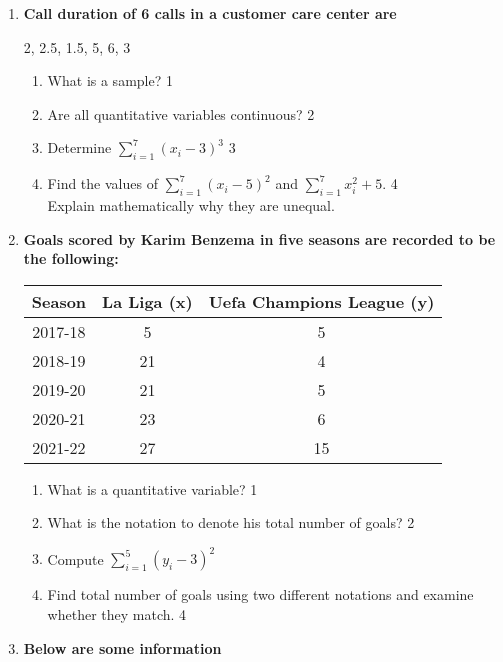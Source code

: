 \documentclass[a4paper,oneside]{book}
\begin{document}
\begin{enumerate}
  
   \item
  \textbf{Call duration of 6 calls in a customer care center are}
  
  \begin{center}
  2, 2.5, 1.5, 5, 6, 3
  \end{center}
 
  \begin{enumerate}
    \item
	What is a sample? \hfill 1
    \item
    	Are all quantitative variables continuous?  \hfill 2
    \item
    	Determine $\displaystyle \sum_{i=1}^7 (x_i-3)^3$ \hfill 3
     \item
     	Find the values of  $\displaystyle \sum_{i=1}^7 (x_i-5)^2$ and $\displaystyle \sum_{i=1}^7 x_i^2+5.$  \hfill 4 \\
     	Explain mathematically why they are unequal.
  \end{enumerate}
  
   \item
	  \textbf{Goals scored by Karim Benzema in five seasons are recorded to be the following:} 
	  
	  \begin{table}[h]
	  \centering
\begin{tabular}{c|c|c}
Season & La Liga (x) & Uefa Champions League (y) \\ \hline
2017-18 & 5 & 5 \\ 
2018-19 & 21 & 4 \\
2019-20 & 21 & 5 \\
2020-21 & 23 & 6 \\ 
2021-22 & 27 & 15 \\ \hline
\end{tabular}
\end{table}
  
  \begin{enumerate}
    \item
	What is a quantitative variable? \hfill 1
    \item
	What is the notation to denote his total number of goals? \hfill 2
    \item  
	Compute $\displaystyle \sum_{i=1}^5 (y_i - 3)^2$ \hfill 
    \item
	Find total number of goals using two different notations and examine whether they match. \hfill 4
  \end{enumerate}

  
 \item
	  \textbf{Below are some information} 
  

\end{enumerate}
\end{document}
